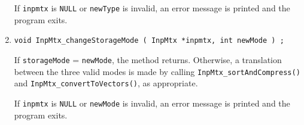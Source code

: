 \begin{enumerate}
\par {}
If {\tt inpmtx} is {\tt NULL} or {\tt newType} is invalid,
an error message is printed and the program exits.
\item
\begin{verbatim}
void InpMtx_changeStorageMode ( InpMtx *inpmtx, int newMode ) ;
\end{verbatim}
If {\tt storageMode} = {\tt newMode}, the method returns.
Otherwise, a translation between the three valid modes is made
by calling {\tt InpMtx\_sortAndCompress()} and
{\tt InpMtx\_convertToVectors()}, as appropriate.
\par {}
If {\tt inpmtx} is {\tt NULL} or {\tt newMode} is invalid,
an error message is printed and the program exits.
\end{enumerate}
\par
